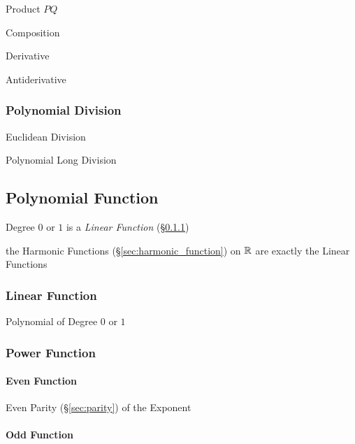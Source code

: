 Product $P Q$

Composition

Derivative

Antiderivative



\subsubsection{Polynomial Division}\label{sec:polynomial_division}

Euclidean Division

Polynomial Long Division



\subsection{Polynomial Function}\label{sec:polynomial_function}

Degree $0$ or $1$ is a \emph{Linear Function} (\S\ref{sec:linear_function})

the Harmonic Functions (\S\ref{sec:harmonic_function}) on $\mathbb{R}$ are
exactly the Linear Functions



\subsubsection{Linear Function}\label{sec:linear_function}

Polynomial of Degree $0$ or $1$



\subsubsection{Power Function}\label{sec:power_function}


\paragraph{Even Function}\label{sec:even_function}\hfill

Even Parity (\S\ref{sec:parity}) of the Exponent



\paragraph{Odd Function}\label{sec:odd_function}\hfill

